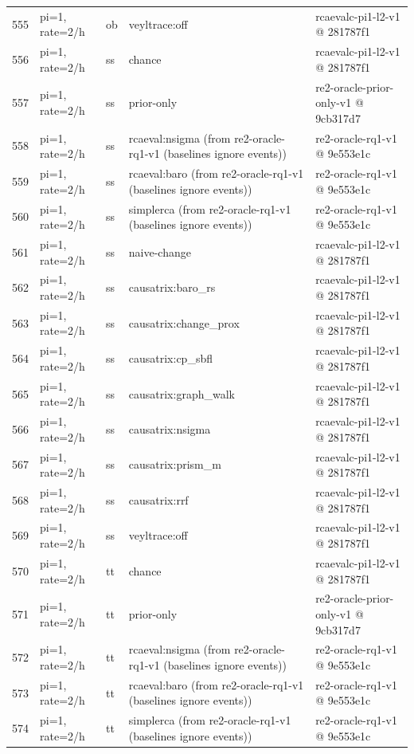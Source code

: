 \begin{longtable}{@{}r>{\raggedright\arraybackslash}p{48.0pt}>{\raggedright\arraybackslash}p{18.0pt}>{\raggedright\arraybackslash}p{108.0pt}>{\raggedright\arraybackslash}p{105.0pt}@{}}
555 & pi=1, rate=2/h & ob & veyltrace:off & rcaevalc-pi1-l2-v1 @ 281787f1 \\
556 & pi=1, rate=2/h & ss & chance & rcaevalc-pi1-l2-v1 @ 281787f1 \\
557 & pi=1, rate=2/h & ss & prior-only & re2-oracle-prior-only-v1 @ 9cb317d7 \\
558 & pi=1, rate=2/h & ss & rcaeval:nsigma (from re2-oracle-rq1-v1 (baselines ignore events)) & re2-oracle-rq1-v1 @ 9e553e1c \\
559 & pi=1, rate=2/h & ss & rcaeval:baro (from re2-oracle-rq1-v1 (baselines ignore events)) & re2-oracle-rq1-v1 @ 9e553e1c \\
560 & pi=1, rate=2/h & ss & simplerca (from re2-oracle-rq1-v1 (baselines ignore events)) & re2-oracle-rq1-v1 @ 9e553e1c \\
561 & pi=1, rate=2/h & ss & naive-change & rcaevalc-pi1-l2-v1 @ 281787f1 \\
562 & pi=1, rate=2/h & ss & causatrix:baro\_rs & rcaevalc-pi1-l2-v1 @ 281787f1 \\
563 & pi=1, rate=2/h & ss & causatrix:change\_prox & rcaevalc-pi1-l2-v1 @ 281787f1 \\
564 & pi=1, rate=2/h & ss & causatrix:cp\_sbfl & rcaevalc-pi1-l2-v1 @ 281787f1 \\
565 & pi=1, rate=2/h & ss & causatrix:graph\_walk & rcaevalc-pi1-l2-v1 @ 281787f1 \\
566 & pi=1, rate=2/h & ss & causatrix:nsigma & rcaevalc-pi1-l2-v1 @ 281787f1 \\
567 & pi=1, rate=2/h & ss & causatrix:prism\_m & rcaevalc-pi1-l2-v1 @ 281787f1 \\
568 & pi=1, rate=2/h & ss & causatrix:rrf & rcaevalc-pi1-l2-v1 @ 281787f1 \\
569 & pi=1, rate=2/h & ss & veyltrace:off & rcaevalc-pi1-l2-v1 @ 281787f1 \\
570 & pi=1, rate=2/h & tt & chance & rcaevalc-pi1-l2-v1 @ 281787f1 \\
571 & pi=1, rate=2/h & tt & prior-only & re2-oracle-prior-only-v1 @ 9cb317d7 \\
572 & pi=1, rate=2/h & tt & rcaeval:nsigma (from re2-oracle-rq1-v1 (baselines ignore events)) & re2-oracle-rq1-v1 @ 9e553e1c \\
573 & pi=1, rate=2/h & tt & rcaeval:baro (from re2-oracle-rq1-v1 (baselines ignore events)) & re2-oracle-rq1-v1 @ 9e553e1c \\
574 & pi=1, rate=2/h & tt & simplerca (from re2-oracle-rq1-v1 (baselines ignore events)) & re2-oracle-rq1-v1 @ 9e553e1c \\

\end{longtable}

